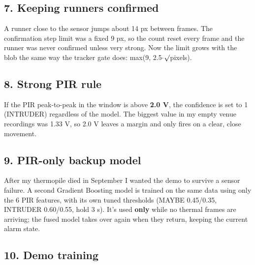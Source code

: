 \documentclass[11pt,a4paper]{article}
\begin{document}
\hypertarget{keeping-runners-confirmed}{%
\subsection{7. Keeping runners
confirmed}\label{keeping-runners-confirmed}}

A runner close to the sensor
jumps about 14 px between
frames. The confirmation step
limit was a fixed 9 px, so the
count reset every frame and
the runner was never confirmed
unless very strong. Now the
limit grows with the blob the
same way the tracker gate
does: max(9, 2.5$\cdot$$\surd$pixels).

\hypertarget{strong-pir-rule}{%
\subsection{8. Strong PIR
rule}\label{strong-pir-rule}}

If the PIR peak-to-peak in the
window is above \textbf{2.0
V}, the confidence is set to 1
(INTRUDER) regardless of the
model. The biggest value in my
empty venue recordings was
1.33 V, so 2.0 V leaves a
margin and only fires on a
clear, close movement.

\hypertarget{pir-only-backup-model}{%
\subsection{9. PIR-only backup
model}\label{pir-only-backup-model}}

After my thermopile died in
September I wanted the demo to
survive a sensor failure. A
second Gradient Boosting model
is trained on the same data
using only the 6 PIR features,
with its own tuned thresholds
(MAYBE 0.45/0.35, INTRUDER
0.60/0.55, hold 3 s). It's
used \textbf{only} while no
thermal frames are arriving;
the fused model takes over
again when they return,
keeping the current alarm
state.

\hypertarget{demo-training}{%
\subsection{10. Demo
training}\label{demo-training}}
\end{document}
